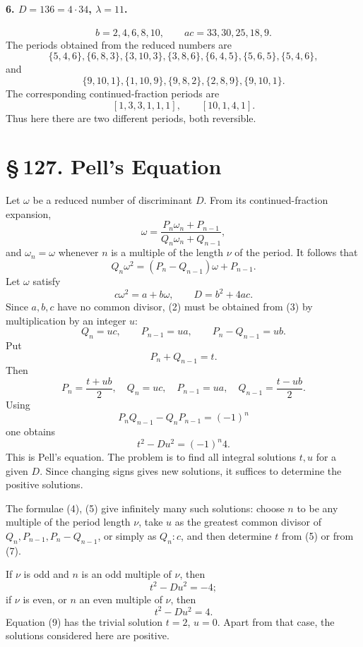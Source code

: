\documentclass[11pt]{article}
\providecommand{\sect}[2]{\section*{\S\,#1. #2}}
\begin{document}
\paragraph{6. $D=136=4\cdot34$, $\lambda=11$.}
\[
        b=2,4,6,8,10,\qquad ac=33,30,25,18,9.
\]
The periods obtained from the reduced numbers are
\[
\{5,4,6\},\{6,8,3\},\{3,10,3\},\{3,8,6\},\{6,4,5\},\{5,6,5\},\{5,4,6\},
\]
and
\[
\{9,10,1\},\{1,10,9\},\{9,8,2\},\{2,8,9\},\{9,10,1\}.
\]
The corresponding continued-fraction periods are
\[
        [1,3,3,1,1,1],\qquad [10,1,4,1].
\]
Thus here there are two different periods, both reversible.

\sect{127}{Pell's Equation}

Let $\omega$ be a reduced number of discriminant $D$. From its continued-fraction expansion,
\[
\tag{1}        \omega=\frac{P_n\omega_n+P_{n-1}}{Q_n\omega_n+Q_{n-1}},
\]
and $\omega_n=\omega$ whenever $n$ is a multiple of the length $\nu$ of the period. It follows that
\[
\tag{2}        Q_n\omega^2=(P_n-Q_{n-1})\omega+P_{n-1}.
\]
Let $\omega$ satisfy
\[
\tag{3}        c\omega^2=a+b\omega,\qquad D=b^2+4ac.
\]
Since $a,b,c$ have no common divisor, (2) must be obtained from (3) by multiplication by an integer $u$:
\[
\tag{4}        Q_n=uc,\qquad P_{n-1}=ua,\qquad P_n-Q_{n-1}=ub.
\]
Put
\[
\tag{5}        P_n+Q_{n-1}=t.
\]
Then
\[
\tag{6}        P_n=\frac{t+ub}{2},\quad Q_n=uc,\quad
        P_{n-1}=ua,\quad Q_{n-1}=\frac{t-ub}{2}.
\]
Using
\[
        P_nQ_{n-1}-Q_nP_{n-1}=(-1)^n
\]
one obtains
\[
\tag{7}        t^2-Du^2=(-1)^n4.
\]
This is Pell's equation. The problem is to find all integral solutions $t,u$ for a given $D$. Since changing signs gives new solutions, it suffices to determine the positive solutions.

The formulae (4), (5) give infinitely many such solutions: choose $n$ to be any multiple of the period length $\nu$, take $u$ as the greatest common divisor of $Q_n,P_{n-1},P_n-Q_{n-1}$, or simply as $Q_n:c$, and then determine $t$ from (5) or from (7).

If $\nu$ is odd and $n$ is an odd multiple of $\nu$, then
\[
\tag{8}        t^2-Du^2=-4;
\]
if $\nu$ is even, or $n$ an even multiple of $\nu$, then
\[
\tag{9}        t^2-Du^2=4.
\]
Equation (9) has the trivial solution $t=2$, $u=0$. Apart from that case, the solutions considered here are positive.
\end{document}
